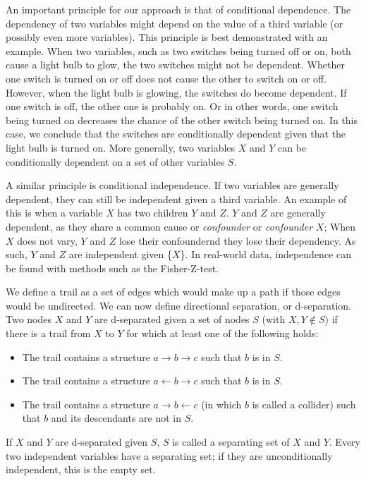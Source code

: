 \documentclass[a4paper, 10pt, english, onecolumn]{article}
\begin{document}
An important principle for our approach is that of conditional dependence.
The dependency of two variables might depend on the value of a third variable (or possibly even more variables).
This principle is best demonstrated with an example.
When two variables, such as two switches being turned off or on, both cause a light bulb to glow, the two switches might not be dependent.
Whether one switch is turned on or off does not cause the other to switch on or off.
However, when the light bulb is glowing, the switches do become dependent.
If one switch is off, the other one is probably on.
Or in other words, one switch being turned on decreases the chance of the other switch being turned on.
In this case, we conclude that the switches are conditionally dependent given that the light bulb is turned on.
More generally, two variables $X$ and $Y$ can be conditionally dependent on a set of other variables $S$. %

A similar principle is conditional independence.
If two variables are generally dependent, they can still be independent given a third variable.
An example of this is when a variable $X$ has two children $Y$ and $Z$.
$Y$ and $Z$ are generally dependent, as they share a common cause or \emph{confounder} or \emph{confounder} $X$;
When $X$ does not vary, $Y$ and $Z$ lose their confoundernd they lose their dependency.
As such, $Y$ and $Z$ are independent given \{$X$\}.
In real-world data, independence can be found with methods such as the Fisher-Z-test. 

We define a trail as a set of edges which would make up a path if those edges would be undirected.
We can now define directional separation, or d-separation.
Two nodes $X$ and $Y$ are d-separated given a set of nodes $S$ (with $X, Y \notin S$) if there is a trail from $X$ to $Y$ for which at least one of the following holds:
\begin{itemize}
\item The trail contains a structure $a \rightarrow b \rightarrow c$ such that $b$ is in $S$.
\item The trail contains a structure $a \leftarrow b \rightarrow c$ such that $b$ is in $S$.
\item The trail contains a structure $a \rightarrow b \leftarrow c$ (in which $b$ is called a collider) such that $b$ and its descendants are not in $S$.
\end{itemize}
If $X$ and $Y$ are d-separated given $S$, $S$ is called a separating set of $X$ and $Y$. Every two independent variables have a separating set; if they are unconditionally independent, this is the empty  set.
\end{document}
